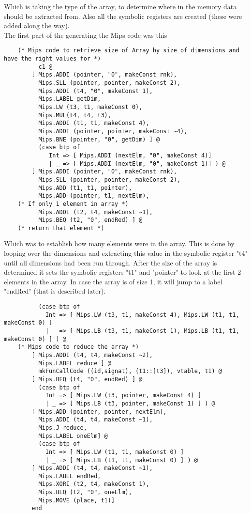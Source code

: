 \documentclass[12pt]{article}
\begin{document}
\endgroup
Which is taking the type of the array, to determine where in the memory data should be extracted from. Also all the symbolic registers are created (these were added along the way).\\
The first part of the generating the Mips code was this
\begingroup
    \fontsize{7pt}{12pt}\selectfont
    \begin{verbatim}
    (* Mips code to retrieve size of Array by size of dimensions and have the right values for *)
          c1 @
        [ Mips.ADDI (pointer, "0", makeConst rnk),
          Mips.SLL (pointer, pointer, makeConst 2),
          Mips.ADDI (t4, "0", makeConst 1),
          Mips.LABEL getDim,
          Mips.LW (t3, t1, makeConst 0),
          Mips.MUL(t4, t4, t3),
          Mips.ADDI (t1, t1, makeConst 4),
          Mips.ADDI (pointer, pointer, makeConst ~4),
          Mips.BNE (pointer, "0", getDim) ] @
          (case btp of 
             Int => [ Mips.ADDI (nextElm, "0", makeConst 4)]
             | _ => [ Mips.ADDI (nextElm, "0", makeConst 1)] ) @
        [ Mips.ADDI (pointer, "0", makeConst rnk),
          Mips.SLL (pointer, pointer, makeConst 2),
          Mips.ADD (t1, t1, pointer),
          Mips.ADD (pointer, t1, nextElm),
    (* If only 1 element in array *)
          Mips.ADDI (t2, t4, makeConst ~1),
          Mips.BEQ (t2, "0", endRed) ] @
    (* return that element *)
    \end{verbatim}
\endgroup
Which was to establish how many elements were in the array. This is done by looping over the dimensions and extracting this value in the symbolic register "t4" until all dimensions had been run through.  After the size of the array is determined it sets the symbolic registers "t1" and "pointer" to look at the first 2 elements in the array. In case the array is of size 1, it will jump to a label "endRed" (that is described later).\\
\begingroup
    \fontsize{7pt}{12pt}\selectfont
    \begin{verbatim}
          (case btp of 
            Int => [ Mips.LW (t3, t1, makeConst 4), Mips.LW (t1, t1, makeConst 0) ]
            | _ => [ Mips.LB (t3, t1, makeConst 1), Mips.LB (t1, t1, makeConst 0) ] ) @
    (* Mips code to reduce the array *)
        [ Mips.ADDI (t4, t4, makeConst ~2),
          Mips.LABEL reduce ] @
          mkFunCallCode ((id,signat), (t1::[t3]), vtable, t1) @
        [ Mips.BEQ (t4, "0", endRed) ] @
          (case btp of 
            Int => [ Mips.LW (t3, pointer, makeConst 4) ]
            | _ => [ Mips.LB (t3, pointer, makeConst 1) ] ) @
        [ Mips.ADD (pointer, pointer, nextElm),
          Mips.ADDI (t4, t4, makeConst ~1),
          Mips.J reduce,
          Mips.LABEL oneElm] @
          (case btp of 
            Int => [ Mips.LW (t1, t1, makeConst 0) ]
            | _ => [ Mips.LB (t1, t1, makeConst 0) ] ) @
        [ Mips.ADDI (t4, t4, makeConst ~1),
          Mips.LABEL endRed,
          Mips.XORI (t2, t4, makeConst 1),
          Mips.BEQ (t2, "0", oneElm),
          Mips.MOVE (place, t1)]
        end
    \end{verbatim}
\end{document}
